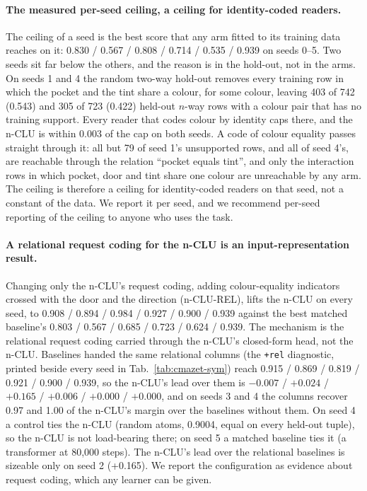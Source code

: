 \documentclass{article} %
\begin{document}
\paragraph{The measured per-seed ceiling, a ceiling for identity-coded readers.} The ceiling of a
seed is the best score that any arm fitted to its training data reaches on it: 0.830 / 0.567 / 0.808
/ 0.714 / 0.535 / 0.939 on seeds 0--5. Two seeds sit far below the others, and the reason is in the
hold-out, not in the arms. On seeds 1 and 4 the random two-way hold-out removes every training row in
which the pocket and the tint share a colour, for some colour, leaving 403 of 742 (0.543) and 305 of
723 (0.422) held-out $n$-way rows with a colour pair that has no training support. Every reader that
codes colour by identity caps there, and the n-CLU is within 0.003 of the cap on both seeds. A code of
colour equality passes straight through it: all but 79 of seed 1's unsupported rows, and all of seed
4's, are reachable through the relation ``pocket equals tint'', and only the interaction rows in which
pocket, door and tint share one colour are unreachable by any arm. The ceiling is therefore a ceiling
for identity-coded readers on that seed, not a constant of the data. We report it per seed, and we
recommend per-seed reporting of the ceiling to anyone who uses the task.

\paragraph{A relational request coding for the n-CLU is an input-representation result.} Changing only the
n-CLU's request coding, adding colour-equality indicators crossed with the door and the direction
(n-CLU-REL), lifts the n-CLU on every seed, to 0.908 / 0.894 / 0.984 / 0.927 / 0.900 / 0.939
against the best matched baseline's 0.803 / 0.567 / 0.685 / 0.723 / 0.624 / 0.939. The mechanism is the
relational request coding carried through the n-CLU's closed-form head, not the n-CLU. Baselines handed
the same relational columns (the \texttt{+rel} diagnostic, printed beside every seed in
Tab.~\ref{tab:cmazet-sym}) reach 0.915 / 0.869 / 0.819 / 0.921 / 0.900 / 0.939, so the n-CLU's lead
over them is $-0.007$ / $+0.024$ / $+0.165$ / $+0.006$ / $+0.000$ / $+0.000$, and on seeds 3 and 4 the
columns recover 0.97 and 1.00 of the n-CLU's margin over the baselines without them. On seed 4 a control
ties the n-CLU (random atoms, 0.9004, equal on every held-out tuple), so the n-CLU is not load-bearing
there; on seed 5 a matched baseline ties it (a transformer at 80,000 steps). The n-CLU's lead over the
relational baselines is sizeable only on seed 2 (+0.165). We report the configuration as evidence about
request coding, which any learner can be given.
\end{document}
